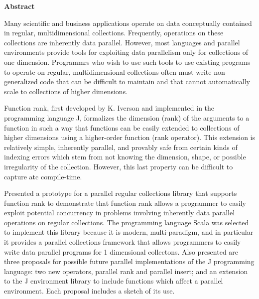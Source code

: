 \begin{center}

\bigskip

\begin{Large}
\textbf{\theTitle}
\end{Large}

\bigskip

\begin{large}
\theAuthor
\end{large}

\bigskip
\bigskip

\textbf{Abstract}

\end{center}

\noindent
Many scientific and business applications operate on 
data conceptually contained in regular, multidimensional collections.
Frequently, operations on these collections are inherently data parallel.
However, most languages and parallel environments 
provide tools for exploiting data parallelism only for collections of one dimension.
Programmrs who wish to use such tools to use existing programs to operate on regular, multidimensional collections
often must write non-generalized code that can be difficult to maintain and 
that cannot automatically scale to collections of higher dimensions.

Function rank, first developed by K. Iverson and implemented in the programming language J, 
formalizes the dimension (rank) of the arguments to a function in such a way 
that functions can be easily extended to collections of higher dimensions using a higher-order function (rank operator).
This extension is relatively simple, inherently parallel, and provably safe 
from certain kinds of indexing errors which stem from not knowing the dimension, shape, or possible irregularity of the collection.
However, this last property can be difficult to capture atc compile-time.

Presented a prototype for a parallel regular collections library that supports function rank 
to demonstrate that function rank allows a programmer to easily exploit potential concurrency 
in problems involving inherently data parallel operations on regular collections.
The programming language Scala was selected to implement this library because it is modern, multi-paradigm, 
and in particular it provides a parallel collections framework that 
allows programmers to easily write data parallel programs for 1 dimensional collectons.
Also presented are three proposals for possible future parallel implementations of the J programming language:
two new operators, parallel rank and parallel insert;
and an extension to the J environment library to include functions which affect a parallel environment.
Each proposal includes a sketch of its use.

